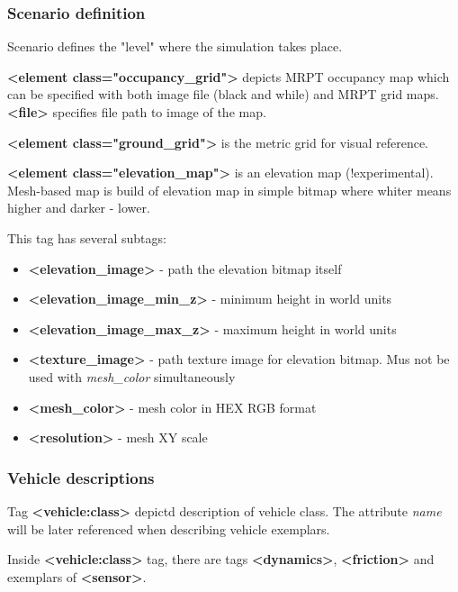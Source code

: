 \documentclass[a4paper,11pt]{article}
\begin{document}
\subsubsection{Scenario definition}

Scenario defines the "level" where the simulation takes place.


\textbf{\textless element class="occupancy\_grid"\textgreater} depicts MRPT occupancy map which can be specified with both image file (black and while) and MRPT grid maps.
\textbf{\textless file\textgreater} specifies file path to image of the map.

\textbf{\textless element class="ground\_grid"\textgreater} is the metric grid for visual reference. 

\textbf{\textless element class="elevation\_map"\textgreater} is an elevation map (!experimental). Mesh-based map is build of elevation map in simple bitmap where whiter means higher and darker - lower.

This tag has several subtags:

\begin{itemize}
	\item \textbf{\textless elevation\_image\textgreater} - path the elevation bitmap itself
	\item \textbf{\textless elevation\_image\_min\_z\textgreater} - minimum height in world units
	\item \textbf{\textless elevation\_image\_max\_z\textgreater} - maximum height in world units
	\item \textbf{\textless texture\_image\textgreater} - path texture image for elevation bitmap. Mus not be used with \textit{mesh\_color} simultaneously
	\item \textbf{\textless mesh\_color\textgreater} - mesh color in HEX RGB format
	\item \textbf{\textless resolution\textgreater} - mesh XY scale
\end{itemize}

\subsubsection{Vehicle descriptions}

Tag \textbf{\textless vehicle:class\textgreater} depictd description of vehicle class. The attribute \textit{name} will be later referenced when describing vehicle exemplars.

Inside \textbf{\textless vehicle:class\textgreater} tag, there are tags \textbf{\textless dynamics\textgreater}, \textbf{\textless friction\textgreater} and exemplars of \textbf{\textless sensor\textgreater}.
\end{document}
